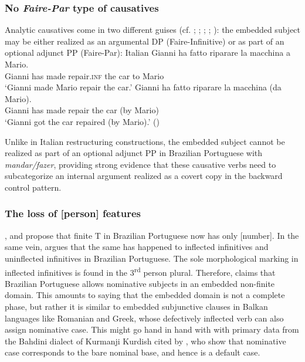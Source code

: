 \documentclass[output=paper]{langsci/langscibook}
\begin{document}
\subsubsection{No \textit{Faire-Par} type of causatives} %

Analytic causatives come in two different guises (cf. \citealt{Kayne1975}; \citealt{Huber1980}; \citealt{Burzio1986}; \citealt{Enzinger2010}; \citealt{Campanini2012}): the embedded subject may be either realized as an argumental DP  (Faire-Infinitive) or as part of an optional adjunct PP (Faire-Par):
\ea%
         Italian\label{ex:moreno:18}
    \ea  
    \gll Gianni ha  fatto   riparare    la   macchina a Mario.\\
         Gianni has made repair.\textsc{inf} the car    to Mario \\
    \glt ‘Gianni made Mario repair the car.’
    \ex  
    \gll Gianni ha fatto    riparare   la  macchina   (da Mario). \\
         Gianni has made repair   the car  (by Mario) \\
    \glt ‘Gianni got the car repaired (by Mario).’ (\citealt{Campanini2012})
    \z
\z

Unlike in Italian restructuring constructions, the embedded subject cannot be realized as part of an optional adjunct PP in Brazilian Portuguese with \textit{mandar\slash fazer}, providing strong evidence that these causative verbs need to subcategorize an internal argument realized as a covert copy in the backward control pattern. 

    \z



\subsubsection{The loss of [person] features}%

\citet{Nunes2008}, \citet{Ferreira2009} and \citet{Rodrigues2004} propose that finite T in Brazilian Portuguese now has only [number]. In the same vein, \citet{Cyrino2010} argues that the same has happened to inflected infinitives and uninflected infinitives in Brazilian Portuguese. The sole morphological marking in inflected infinitives is found in the 3\textsuperscript{rd} person plural. Therefore, \citet{Cyrino2010} claims that Brazilian Portuguese allows nominative subjects in an embedded non-finite domain. This amounts to saying that the embedded domain is not a complete phase, but rather it is similar to embedded subjunctive clauses in Balkan languages like Romanian and Greek, whose defectively inflected verb can also assign nominative case. This might go hand in hand with with primary data from the Bahdini dialect of Kurmanji Kurdish cited by \citet{ManziniEtAl2015}, who show that nominative case corresponds to the bare nominal base, and hence is a default case.  
\end{document}
